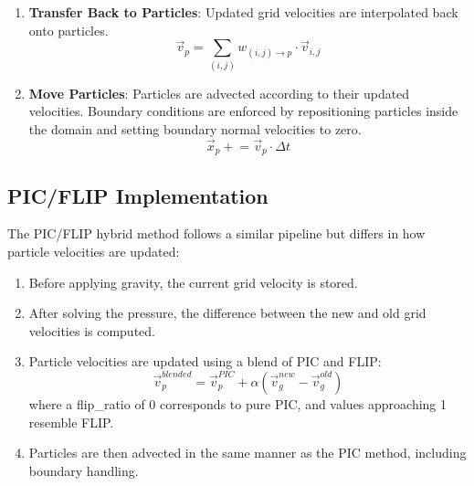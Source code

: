 \begin{enumerate}
\item \textbf{Transfer Back to Particles}: Updated grid velocities are interpolated back onto particles.
\begin{equation}
  \vec{v}_p = \sum_{(i,j)} w_{(i,j) \rightarrow p} \cdot \vec{v}_{i,j}
  \end{equation}

\item \textbf{Move Particles}: Particles are advected according to their updated velocities. Boundary conditions are enforced by repositioning particles inside the domain and setting boundary normal velocities to zero.
\begin{equation}
  \vec{x}_p \mathrel{+}= \vec{v}_p \cdot \Delta t
  \end{equation}
\end{enumerate}

\subsection{PIC/FLIP Implementation}

The PIC/FLIP hybrid method follows a similar pipeline but differs in how particle velocities are updated:

\begin{enumerate}
\item Before applying gravity, the current grid velocity is stored.

\item After solving the pressure, the difference between the new and old grid velocities is computed.

\item Particle velocities are updated using a blend of PIC and FLIP:
\begin{equation}
  \vec{v}_p^{blended} = \vec{v}_p^{PIC} + \alpha(\vec{v}_g^{new} - \vec{v}_g^{old})
\end{equation}
where a flip\_ratio of 0 corresponds to pure PIC, and values approaching 1 resemble FLIP.

\item Particles are then advected in the same manner as the PIC method, including boundary handling.
\end{enumerate}

